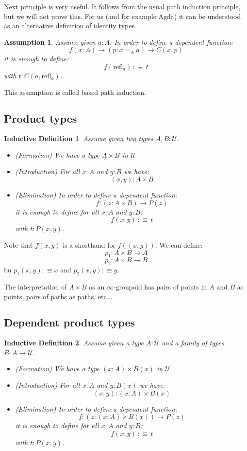 \documentclass{article}
\newcommand{\sse}[1]{\medbreak \subsection{#1}}
\newcommand{\U}{{\mathcal U}}
\renewcommand{\r}{\rightarrow}
\newcommand{\refl}{\mathrm{refl}}
\newtheorem{remark}{Remark}
\newtheorem{ind_def}{Inductive Definition}
\newtheorem{assumption}{Assumption}
\begin{document}
Next principle is very useful. It follows from the usual path induction principle, but we will not prove this. For us (and for example Agda) it can be understood as an alternative definition of identity types. %

\begin{assumption}
Assume given $a:A$. In order to define a dependent function:
\[f(x:A)\r (p:x=_Aa)\r C(x,p)\]
it is enough to define:
\[f(\refl_a) \, :\equiv\, t\]
with $t:C(a,\refl_a)$.
\end{assumption}

This assumption is called based path induction.










\sse{Product types}

\begin{ind_def}
Assume given two types $A,B:\U$.
\begin{itemize}
\item (Formation) We have a type $A\times B$ in $\U$
\item (Introduction) For all $x:A$ and $y:B$ we have:
\[(x,y) : A\times B\]
\item (Elimination) In order to define a dependent function: 
\[f : (z:A\times B)\r P(z)\] 
it is enough to define for all $x:A$ and $y:B$:
\[f(x,y)\, :\equiv\, t\]
with $t:P(x,y)$.
\end{itemize}
\end{ind_def}

Note that $f(x,y)$ is a shorthand for $f((x,y))$. We can define:
\[p_1 : A\times B\r A\]
\[p_2 : A\times B \r B\]
 bu $p_1(x,y) :\equiv x$ and $p_2(x,y) :\equiv y$. %

The interpretation of $A\times B$ as an $\infty$-groupoid has pairs of points in $A$ and $B$ as points, pairs of paths as paths, etc...


\sse{Dependent product types}

\begin{ind_def}
Assume given a type $A:\U$ and a family of types $B:A\r \U$.
\begin{itemize}
\item (Formation) We have a type $(x:A)\times B(x)$ in $\U$
\item (Introduction) For all $x:A$ and $y:B(x)$ we have:
\[(x,y) : (x:A)\times B(x)\]
\item (Elimination) In order to define a dependent function: 
\[f : (z:(x:A)\times B(x))\r P(z)\] 
it is enough to define for all $x:A$ and $y:B$:
\[f(x,y)\, :\equiv\, t\]
with $t:P(x,y)$.
\end{itemize}
\end{ind_def}
\end{document}
